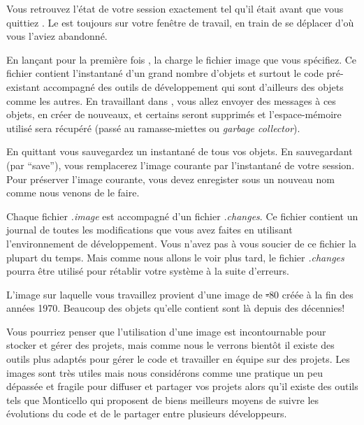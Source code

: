 \documentclass[a4paper,10pt,twoside]{book}
\begin{document}

Vous retrouvez l'état de votre session exactement tel qu'il était
avant que vous quittiez \sq. Le \blobmorph est toujours sur votre
fenêtre de travail, en train de se déplacer d'o\`u vous l'aviez abandonné.

En lançant pour la première fois \sq, la 
charge le fichier image que vous spécifiez. Ce fichier contient
l'instantané d'un grand nombre d'objets et surtout le code
pré-existant accompagné des outils de développement qui sont
d'ailleurs des objets comme les autres. En travaillant dans \sq, vous
allez envoyer des messages à ces objets, en créer de nouveaux, et
certains seront supprimés et l'espace-mémoire utilisé sera récupéré
(\ie pass\'e au ramasse-miettes ou \emph{garbage collector}).

En quittant \sq vous sauvegardez un instantané de tous vos objets. En sauvegardant (par ``save''), vous remplacerez l'image courante par l'instantané de votre session. Pour préserver l'image courante, vous devez enregister sous un nouveau nom comme nous venons de le faire.

Chaque fichier \emph{.image} est accompagné d'un fichier \emph{.changes}.
Ce fichier contient un journal de toutes les modifications que vous avez faites en utilisant l'environnement de développement.
Vous n'avez pas à vous soucier de ce fichier la plupart du temps.
Mais comme nous allons le voir plus tard, le fichier \emph{.changes} pourra être utilisé pour rétablir votre système \sq à la suite d'erreurs.

L'image sur laquelle vous travaillez provient d'une image de \st-80 créée à la fin des années 1970.
Beaucoup des objets qu'elle contient sont là depuis des décennies!

Vous pourriez penser que l'utilisation d'une image est incontournable pour stocker et gérer des projets, mais comme nous le verrons bientôt il existe des outils plus adaptés pour gérer le code et travailler en équipe sur des projets.
Les images sont très utiles mais nous consid\'erons comme une pratique un peu dépassée et fragile pour diffuser et partager vos projets alors qu'il existe des outils tels que Monticello qui proposent de biens meilleurs moyens de suivre les évolutions du code et de le partager entre plusieurs développeurs.

\end{document}
